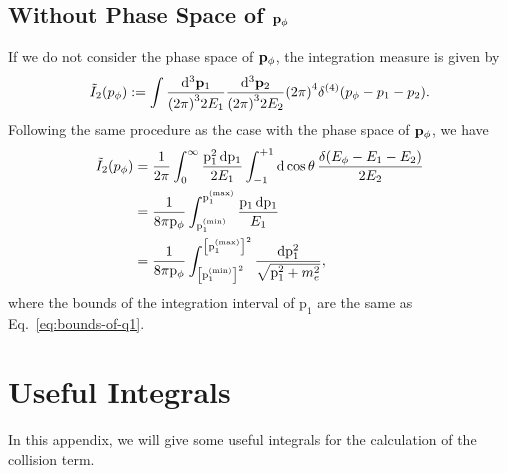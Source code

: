 \documentclass{article}
\begin{document}
        \subsection{Without Phase Space of \texorpdfstring{$\vb{p}_\phi$}{p\_φ}}
            If we do not consider the phase space of $\vb{p}_\phi$, the integration measure is given by
            \begin{equation}
                \tilde{I}_2(p_\phi) := \int \frac{\dd[3]{\vb{p}_1}}{\qty(2 \pi)^3 2 E_1} \frac{\dd[3]{\vb{p}_2}}{\qty(2 \pi)^3 2 E_2} \qty(2 \pi)^4 \delta^{(4)}\qty(p_\phi - p_1 - p_2).
            \end{equation}
            Following the same procedure as the case with the phase space of $\vb{p}_\phi$, we have
            \begin{equation}
                \begin{aligned}
                    \tilde{I}_2(p_\phi) & = \frac{1}{2 \pi} \int_0^\infty \frac{\mathrm{p}_1^2 \dd{\mathrm{p}_1}}{2 E_1} \int_{-1}^{+1} \dd{\cos \theta} \frac{\delta(E_\phi - E_1 - E_2)}{2 E_2} \\
                    & = \frac{1}{8 \pi \mathrm{p}_\phi} \int_{\mathrm{p}_1^\mathrm{(min)}}^{\mathrm{p}_1^\mathrm{(max)}} \frac{\mathrm{p}_1 \dd{\mathrm{p}_1}}{E_1} \\
                    & = \frac{1}{8 \pi \mathrm{p}_\phi} \int_{\qty[\mathrm{p}_1^\mathrm{(min)}]^2}^{\qty[\mathrm{p}_1^\mathrm{(max)}]^2} \frac{\dd{\mathrm{p}_1^2}}{\sqrt{\mathrm{p}_1^2 + m_e^2}},
                \end{aligned}
            \end{equation}
            where the bounds of the integration interval of $\mathrm{p}_1$ are the same as Eq.~\eqref{eq:bounds-of-q1}.

        \section{Useful Integrals}
            In this appendix, we will give some useful integrals for the calculation of the collision term.
\end{document}
